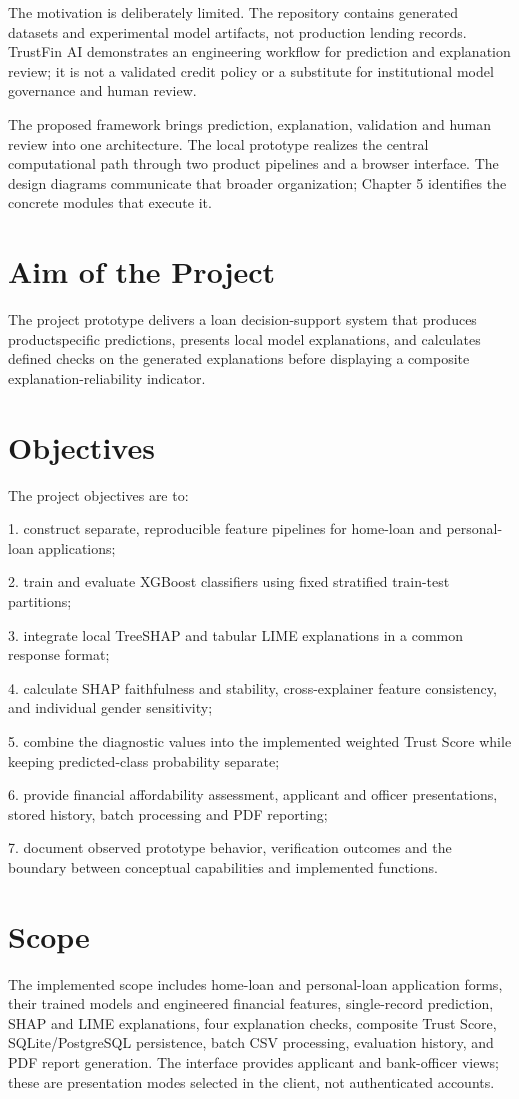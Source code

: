 \documentclass[12pt,a4paper]{report}
\begin{document}
The motivation is deliberately limited. The repository contains generated datasets and experimental model artifacts, not production lending records. TrustFin AI demonstrates an engineering workflow for prediction and explanation review; it is not a validated credit policy or a substitute for institutional model governance and human review.

The proposed framework brings prediction, explanation, validation and human review into one architecture. The local prototype realizes the central computational path through two product pipelines and a browser interface. The design diagrams communicate that broader organization; Chapter 5 identifies the concrete modules that execute it.

\section{Aim of the Project}
The project prototype delivers a loan decision-support system that produces productspecific predictions, presents local model explanations, and calculates defined checks on the generated explanations before displaying a composite explanation-reliability indicator.

\section{Objectives}
The project objectives are to:

1. construct separate, reproducible feature pipelines for home-loan and personal-loan applications;

2. train and evaluate XGBoost classifiers using fixed stratified train-test partitions;

3. integrate local TreeSHAP and tabular LIME explanations in a common response format;

4. calculate SHAP faithfulness and stability, cross-explainer feature consistency, and individual gender sensitivity;

5. combine the diagnostic values into the implemented weighted Trust Score while keeping predicted-class probability separate;

6. provide financial affordability assessment, applicant and officer presentations, stored history, batch processing and PDF reporting;

7. document observed prototype behavior, verification outcomes and the boundary between conceptual capabilities and implemented functions.

\section{Scope}
The implemented scope includes home-loan and personal-loan application forms, their trained models and engineered financial features, single-record prediction, SHAP and LIME explanations, four explanation checks, composite Trust Score, SQLite/PostgreSQL persistence, batch CSV processing, evaluation history, and PDF report generation. The interface provides applicant and bank-officer views; these are presentation modes selected in the client, not authenticated accounts.
\end{document}
